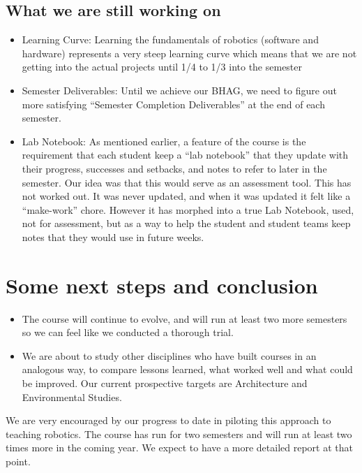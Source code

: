 \subsection{What we are still working on}
\begin{itemize}
\item Learning Curve: Learning the fundamentals of robotics (software and hardware) represents a very steep learning curve which means that we are not getting into the actual projects until 1/4 to 1/3 into the semester
\item Semester Deliverables: Until we achieve our BHAG, we need to figure out more satisfying “Semester Completion Deliverables” at the end of each semester.

\item Lab Notebook: As mentioned earlier, a feature of the course is the requirement that each student keep a ``lab notebook'' that they update with their progress, successes and setbacks, and notes to refer to later in the semester. Our idea was that this would serve as an assessment tool. This has not worked out. It was never updated, and when it was updated it felt like a ``make-work'' chore. However it has morphed into a true Lab Notebook, used, not for assessment, but as a way to help the student and student teams keep notes that they would use in future weeks.
\end{itemize}
\section{Some next steps and conclusion}

\begin{itemize}
\item The course will continue to evolve, and will run at least two more semesters so we can feel like we conducted a thorough trial.
\item We are about to study other disciplines who have built courses in an analogous way, to compare lessons learned, what worked well and what could be improved. Our current prospective targets are Architecture and Environmental Studies.
\end{itemize}

We are very encouraged by our progress to date in piloting this approach to teaching robotics. The course has run for two semesters and will run at least two times more in the coming year. We expect to have a more detailed report at that point.


